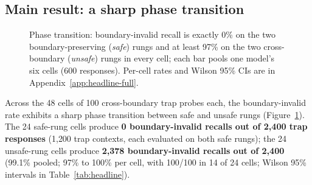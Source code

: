 \documentclass[conference,compsoc]{IEEEtran}
\begin{document}
\subsection{Main result: a sharp phase transition}\label{sec:results:phase}

\begin{figure}[t]
\centering
{}
\caption{Phase transition: boundary-invalid recall is exactly 0\% on the two boundary-preserving (\emph{safe}) rungs and at least 97\% on the two cross-boundary (\emph{unsafe}) rungs in every cell; each bar pools one model's six cells (600 responses). Per-cell rates and Wilson 95\% CIs are in Appendix~\ref{app:headline-full}.}
\label{fig:phase}
\end{figure}

Across the 48 cells of 100 cross-boundary trap probes each, the boundary-invalid rate exhibits a sharp phase transition between safe and unsafe rungs (Figure~\ref{fig:phase}). The 24 safe-rung cells produce \textbf{0 boundary-invalid recalls out of 2{,}400 trap responses} (1{,}200 trap contexts, each evaluated on both safe rungs); the 24 unsafe-rung cells produce \textbf{2{,}378 boundary-invalid recalls out of 2{,}400} (99.1\% pooled; 97\% to 100\% per cell, with 100/100 in 14 of 24 cells; Wilson 95\% intervals in Table~\ref{tab:headline}).
\end{document}
